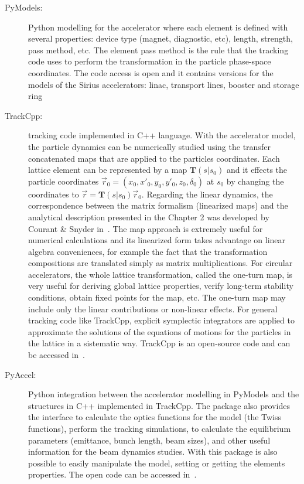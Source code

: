 \begin{description}
    \item[PyModels:] Python modelling for the accelerator where each element is defined with several properties: device type (magnet, diagnostic, etc), length, strength, pass method, etc. The element pass method is the rule that the tracking code uses to perform the transformation in the particle phase-space coordinates. The code access is open and it contains versions for the models of the Sirius accelerators: \gls{linac}, transport lines, booster and storage ring~\cite{pymodels}
    \item[TrackCpp:] tracking code implemented in C++ language. With the accelerator model, the particle dynamics can be numerically studied using the transfer concatenated maps that are applied to the particles coordinates. Each lattice element can be represented by a map $\mathbf{T}(s|s_0)$ and it effects the particle coordinates $\vec{r}_0 = \left(x_0, x'_0, y_0, y'_0, z_0, \delta_0\right)$ at $s_0$ by changing the coordinates to $\vec{r} = \mathbf{T}(s|s_0)\vec{r}_0$. Regarding the linear dynamics, the correspondence between the matrix formalism (linearized maps) and the analytical description presented in the Chapter 2 was developed by Courant \& Snyder in~\cite{CourantSnyder1958}. The map approach is extremely useful for numerical calculations and its linearized form takes advantage on linear algebra conveniences, for example the fact that the transformation compositions are translated simply as matrix multiplications. For circular accelerators, the whole lattice transformation, called the one-turn map, is very useful for deriving global lattice properties, verify long-term stability conditions, obtain fixed points for the map, etc. The one-turn map may include only the linear contributions or non-linear effects. For general tracking code like TrackCpp, explicit symplectic integrators are applied to approximate the solutions of the equations of motions for the particles in the lattice in a sistematic way. TrackCpp is an open-source code and can be accessed in~\cite{trackcpp}.
    \item[PyAccel:] Python integration between the accelerator modelling in PyModels and the structures in C++ implemented in TrackCpp. The package also provides the interface to calculate the optics functions for the model (the Twiss functions), perform the tracking simulations, to calculate the equilibrium parameters (emittance, bunch length, beam sizes), and other useful information for the beam dynamics studies. With this package is also possible to easily manipulate the model, setting or getting the elements properties. The open code can be accessed in~\cite{pyaccel}.
\end{description}

